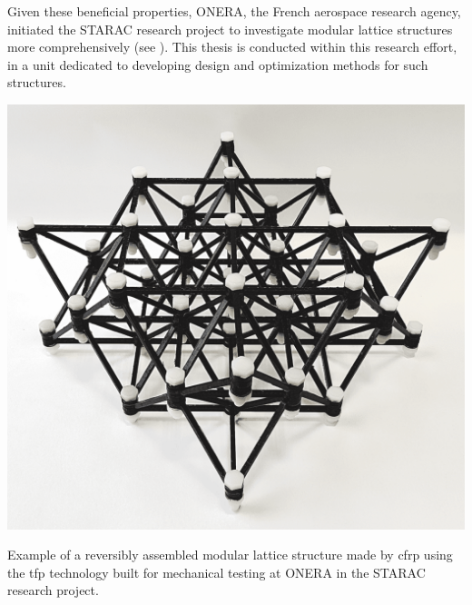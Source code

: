 Given these beneficial properties, ONERA, the French aerospace research agency, initiated the STARAC research project to investigate modular lattice structures more comprehensively (see ). This thesis is conducted within this research effort, in a unit dedicated to developing design and optimization methods for such structures.

\begin{marginfigure}
    \centering
    \includegraphics[width=\linewidth]{figures/01_intro/starac.png}
    \caption{Example of a reversibly assembled modular lattice structure made by \gls{cfrp} using the \gls{tfp} technology built for mechanical testing at ONERA in the STARAC research project.}
    \label{fig:01_starac}
\end{marginfigure}

